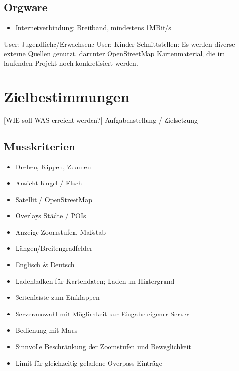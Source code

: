 \documentclass[10pt]{scrreprt}
\begin{document}
\section{Orgware}
\begin{itemize}
\item Internetverbindung: Breitband, mindestens 1MBit/s
\end{itemize}

User: Jugendliche/Erwachsene
User: Kinder
Schnittstellen: Es  werden  diverse  externe  Quellen genutzt, darunter OpenStreetMap Kartenmaterial, die im laufenden Projekt noch konkretisiert werden.




\chapter{Zielbestimmungen}
[WIE soll WAS erreicht werden?]
Aufgabenstellung / Zielsetzung

\section{Musskriterien}
\begin{itemize}
\item Drehen, Kippen, Zoomen
\item Ansicht Kugel / Flach
\item Satellit / OpenStreetMap
\item Overlays Städte / POIs
\item Anzeige Zoomstufen, Maßstab
\item Längen/Breitengradfelder
\item Englisch \& Deutsch
\item Ladenbalken für Kartendaten; Laden im Hintergrund
\item Seitenleiste zum Einklappen
\item Serverauswahl mit Möglichkeit zur Eingabe eigener Server
\item Bedienung mit Maus 
\item Sinnvolle Beschränkung der Zoomstufen und Beweglichkeit 
\item Limit für gleichzeitig geladene Overpass-Einträge
\end{itemize}
\end{document}
